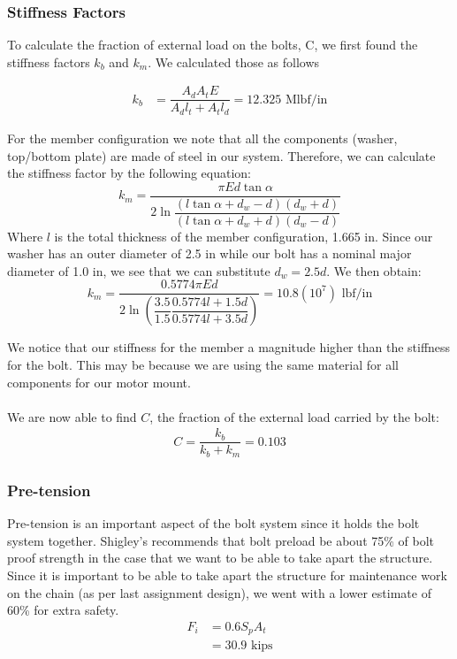 \documentclass[letterpaper,12pt]{article}
\begin{document}
\subsubsection{Stiffness Factors}
To calculate the fraction of external load on the bolts, C, we first found the stiffness factors $k_{b}$ and $k_{m}$. We calculated those as follows

\begin{align*}
    k _ { b } &= \dfrac { A _ { d } A _ { t } E } { A _ { d } l _ { t } + A _ { t } l _ { d } }
    = 12.325 \text{ Mlbf/in} 
\end{align*}

\noindent For the member configuration we note that all the components (washer, top/bottom plate) are made of steel in our system. Therefore, we can calculate the stiffness factor by the following equation:
\begin{equation*}
    k _ { m } = \dfrac { \pi E d \tan \alpha } { 2 \ln \dfrac { \left( l \tan \alpha + d _ { w } - d \right) \left( d _ { w } + d \right) } { \left( l \tan \alpha + d _ { w } + d \right) \left( d _ { w } - d \right) } }
\end{equation*}
Where $l$ is the total thickness of the member configuration, 1.665 in. Since our washer has an outer diameter of 2.5 in while our bolt has a nominal major diameter of 1.0 in, we see that we can substitute $d_w = 2.5d$. We then obtain:
\begin{equation*}
    k _ { m } = \dfrac { 0.5774 \pi E d } { 2 \ln \left( \dfrac{3.5}{1.5} \dfrac { 0.5774 l + 1.5 d } { 0.5774 l + 3.5 d } \right) } = 10.8(10^7) \text{ lbf/in}
\end{equation*}

\noindent We notice that our stiffness for the member a magnitude higher than the stiffness for the bolt. This may be because we are using the same material for all components for our motor mount.\\\\
We are now able to find $C$, the fraction of the external load carried by the bolt:
\begin{align*}
    C = \dfrac { k _ { b } } { k _ { b } + k _ { m } } = 0.103
\end{align*}

\subsubsection{Pre-tension}
Pre-tension is an important aspect of the bolt system since it holds the bolt system together. Shigley's recommends that bolt preload be about 75\% of bolt proof strength in the case that we want to be able to take apart the structure. Since it is important to be able to take apart the structure for maintenance work on the chain (as per last assignment design), we went with a lower estimate of 60\% for extra safety.
\begin{align*}
    F_i &= 0.6S_pA_t\\
    &= 30.9 \text{ kips}
\end{align*}
\end{document}
